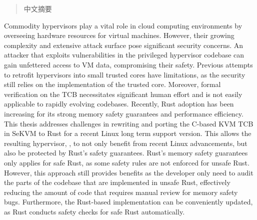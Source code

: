 
\begin{abstract}

中文摘要

\end{abstract}

\begin{abstract*}

Commodity hypervisors play a vital role in cloud computing environments by
overseeing hardware resources for virtual machines. However, their growing
complexity and extensive attack surface pose significant security concerns.
An attacker that exploits vulnerabilities in the privileged hypervisor
codebase can gain unfettered access to VM data, compromising their safety.
Previous attempts to retrofit hypervisors into small trusted cores have
limitations, as the security still relies on the implementation of the trusted
core. Moreover, formal verification on the TCB necessitates significant human
effort and is not easily applicable to rapidly evolving codebases.
Recently, Rust adoption has been increasing for its strong memory safety
guarantees and performance efficiency.
This thesis addresses challenges in rewriting and porting the C-based KVM TCB
in SeKVM to Rust for a recent Linux long term support version. This allows the
resulting hypervisor, \rustsec{}, to not only benefit from recent Linux
advancements, but also be protected by Rust's safety guarantees.
Rust's memory safety guarantees only applies for safe Rust, as some safety
rules are not enforced for unsafe Rust. However, this approach still provides
benefits as the developer only need to audit the parts of the codebase that are
implemented in unsafe Rust, effectively reducing the amount of code that
requires manual review for memory safety bugs.
Furthermore, the Rust-based implementation can be conveniently updated,
as Rust conducts safety checks for safe Rust automatically.

\end{abstract*}
